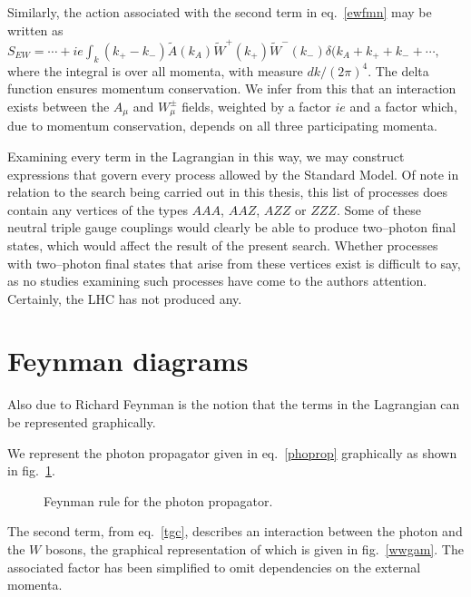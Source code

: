 Similarly, the action associated with the second term in eq.~\eqref{ewfmn} may be written as
\(S_\textit{EW}=\cdots+ie\int_k (k_{+}-k_{-})\tilde A(k_A)\tilde W^{+}(k_{+})\tilde W^{-}(k_{-})\delta(k_A+k_{+}+k_{-}+\cdots,\label{tgc}\)
where the integral is over all momenta, with measure $dk/(2\pi)^4$. The delta function ensures momentum conservation. We infer from this that an interaction exists between the $A_\mu$ and $W^\pm_\mu$ fields, weighted by a factor $ie$ and a factor which, due to momentum conservation, depends on all three participating momenta.

Examining every term in the Lagrangian in this way, we may construct expressions that govern every process allowed by the Standard Model. Of note in relation to the search being carried out in this thesis, this list of processes does contain any vertices of the types $AAA$, $AAZ$, $AZZ$ or $ZZZ$. Some of these neutral triple gauge couplings would clearly be able to produce two--photon final states, which would affect the result of the present search. Whether processes with two--photon final states that arise from these vertices exist is difficult to say, as no studies examining such processes have come to the authors attention. Certainly, the LHC has not produced any. 

\section{Feynman diagrams}
Also due to Richard Feynman is the notion that the terms in the Lagrangian can be represented graphically.

We represent the photon propagator given in eq.~\eqref{phoprop} graphically as shown in fig.~\ref{phoprop}.

\begin{figure}[hbtp]
\begin{minipage}[c]{.69\textwidth}\centering\footnotesize
{}
\end{minipage}\hfill
\begin{minipage}[c]{.3\textwidth}
\caption{Feynman rule for the photon propagator.}
\label{phoprop}
\end{minipage}
\end{figure}

The second term, from eq.~\eqref{tgc}, describes an interaction between the photon and the $W$ bosons, the graphical representation of which is given in fig.~\ref{wwgam}. The associated factor has been simplified to omit dependencies on the external momenta.


